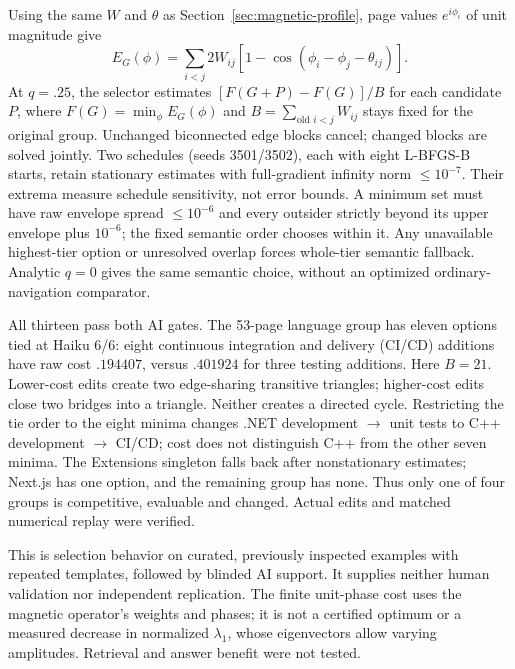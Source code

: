 Using the same $W$ and $\theta$ as Section~\ref{sec:magnetic-profile},
page values $e^{i\phi_i}$ of unit magnitude give
\begin{equation}
 E_G(\phi)=\sum_{i<j}2W_{ij}[1-\cos(\phi_i-\phi_j-\theta_{ij})].
 \label{eq:link-phase}
\end{equation}
At $q=.25$, the selector estimates $[F(G+P)-F(G)]/B$ for each candidate $P$,
where $F(G)=\min_\phi E_G(\phi)$ and $B=\sum_{\text{old }i<j}W_{ij}$ stays
fixed for the original group. Unchanged biconnected edge blocks cancel;
changed blocks are solved jointly. Two schedules (seeds 3501/3502), each with
eight L-BFGS-B starts, retain stationary estimates with full-gradient infinity
norm $\leq10^{-7}$. Their extrema measure schedule sensitivity, not error bounds.
A minimum set must have raw envelope spread $\leq10^{-6}$ and every outsider
strictly beyond its upper envelope plus $10^{-6}$; the fixed semantic order
chooses within it. Any unavailable highest-tier option or unresolved overlap
forces whole-tier semantic fallback. Analytic $q=0$ gives the same semantic
choice, without an optimized ordinary-navigation comparator.

All thirteen pass both AI gates. The 53-page language group has eleven options
tied at Haiku 6/6: eight continuous integration and delivery (CI/CD) additions
have raw cost $.194407$, versus $.401924$ for three testing additions.
Here $B=21$. Lower-cost edits create two edge-sharing transitive triangles;
higher-cost edits close two bridges into a triangle. Neither creates a directed cycle.
Restricting the tie order to the eight minima changes .NET
development $\to$ unit tests to C++ development $\to$ CI/CD; cost does not
distinguish C++ from the other seven minima. The Extensions singleton falls
back after nonstationary estimates; Next.js has one option, and the remaining
group has none. Thus only one of four groups is competitive, evaluable and
changed. Actual edits and matched numerical replay were verified.

This is selection behavior on curated, previously inspected examples with
repeated templates, followed by blinded AI support. It supplies neither human
validation nor independent replication. The finite unit-phase cost uses the
magnetic operator's weights and phases; it is not a certified optimum or a
measured decrease in normalized $\lambda_1$, whose eigenvectors allow varying
amplitudes. Retrieval and answer benefit were not tested.

